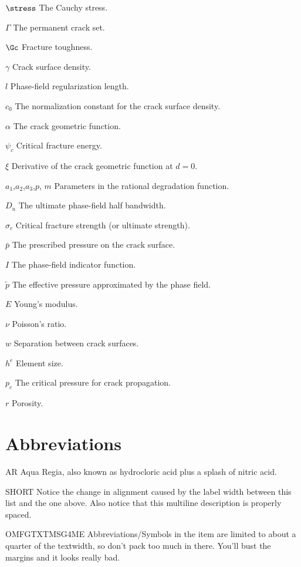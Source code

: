 \begin{symbollist}
  \item[$\stress$] The Cauchy stress.
  \item[$\Gamma$] The permanent crack set.
  \item[$\Gc$] Fracture toughness.
  \item[$\gamma$] Crack surface density.
  \item[$l$] Phase-field regularization length.
  \item[$c_0$] The normalization constant for the crack surface density.
  \item[$\alpha$] The crack geometric function.
  \item[$\psi_c$] Critical fracture energy.
  \item[$\xi$] Derivative of the crack geometric function at $d = 0$.
  \item[$a_1$,$a_2$,$a_3$,$p$, $m$] Parameters in the rational degradation function.
  \item[$D_u$] The ultimate phase-field half bandwidth.
  \item[$\sigma_c$] Critical fracture strength (or ultimate strength).
  \item[$\bar{p}$] The prescribed pressure on the crack surface.
  \item[$I$] The phase-field indicator function.
  \item[$\widetilde{p}$] The effective pressure approximated by the phase field.
  \item[$E$] Young's modulus.
  \item[$\nu$] Poisson's ratio.
  \item[$w$] Separation between crack surfaces.
  \item[$h^e$] Element size.
  \item[$p_c$] The critical pressure for crack propagation.
  \item[$r$] Porosity.
\end{symbollist}

\section*{Abbreviations}


\begin{symbollist}
  \item[AR] Aqua Regia, also known as hydrocloric acid plus a splash of
  nitric acid.
  \item[SHORT] Notice the change in alignment caused by the label width
  between this list and the one above.  Also notice that this multiline
  description is properly spaced.
  \item[OMFGTXTMSG4ME] Abbreviations/Symbols in the item are limited to
  about a quarter of the textwidth, so don't pack too much in there.
  You'll bust the margins and it looks really bad.
\end{symbollist}
